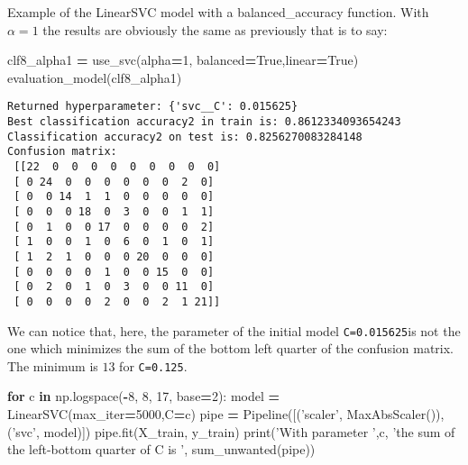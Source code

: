 \documentclass[10pt,a4paper]{article}
\newenvironment{Shaded}{\begin{snugshade}}{\end{snugshade}}
\newcommand{\BuiltInTok}[1]{#1}
\newcommand{\ControlFlowTok}[1]{\textcolor[rgb]{0.13,0.29,0.53}{\textbf{#1}}}
\newcommand{\DecValTok}[1]{\textcolor[rgb]{0.00,0.00,0.81}{#1}}
\newcommand{\KeywordTok}[1]{\textcolor[rgb]{0.13,0.29,0.53}{\textbf{#1}}}
\newcommand{\NormalTok}[1]{#1}
\newcommand{\OperatorTok}[1]{\textcolor[rgb]{0.81,0.36,0.00}{\textbf{#1}}}
\newcommand{\StringTok}[1]{\textcolor[rgb]{0.31,0.60,0.02}{#1}}
\newcommand{\VariableTok}[1]{\textcolor[rgb]{0.00,0.00,0.00}{#1}}
\theoremstyle{break}
\begin{document}
Example of the LinearSVC model with a balanced\_accuracy function. With \(\alpha = 1\) the results are obviously the same as previously that is to say:

\begin{Shaded}
\begin{Highlighting}[]
\NormalTok{clf8_alpha1 }\OperatorTok{=}\NormalTok{ use_svc(alpha}\OperatorTok{=}\DecValTok{1}\NormalTok{, balanced}\OperatorTok{=}\VariableTok{True}\NormalTok{,linear}\OperatorTok{=}\VariableTok{True}\NormalTok{)}
\NormalTok{evaluation_model(clf8_alpha1)}
\end{Highlighting}
\end{Shaded}

\begin{verbatim}
Returned hyperparameter: {'svc__C': 0.015625}
Best classification accuracy2 in train is: 0.8612334093654243
Classification accuracy2 on test is: 0.8256270083284148
Confusion matrix: 
 [[22  0  0  0  0  0  0  0  0  0]
 [ 0 24  0  0  0  0  0  0  2  0]
 [ 0  0 14  1  1  0  0  0  0  0]
 [ 0  0  0 18  0  3  0  0  1  1]
 [ 0  1  0  0 17  0  0  0  0  2]
 [ 1  0  0  1  0  6  0  1  0  1]
 [ 1  2  1  0  0  0 20  0  0  0]
 [ 0  0  0  0  1  0  0 15  0  0]
 [ 0  2  0  1  0  3  0  0 11  0]
 [ 0  0  0  0  2  0  0  2  1 21]]
\end{verbatim}

We can notice that, here, the parameter of the initial model \texttt{C=0.015625}is not the one which minimizes the sum of the bottom left quarter of the confusion matrix. The minimum is \(13\) for \texttt{C=0.125}.

\begin{Shaded}
\begin{Highlighting}[]
\ControlFlowTok{for}\NormalTok{ c }\KeywordTok{in}\NormalTok{ np.logspace(}\OperatorTok{-}\DecValTok{8}\NormalTok{, }\DecValTok{8}\NormalTok{, }\DecValTok{17}\NormalTok{, base}\OperatorTok{=}\DecValTok{2}\NormalTok{):}
\NormalTok{    model }\OperatorTok{=}\NormalTok{ LinearSVC(max_iter}\OperatorTok{=}\DecValTok{5000}\NormalTok{,C}\OperatorTok{=}\NormalTok{c)}
\NormalTok{    pipe }\OperatorTok{=}\NormalTok{ Pipeline([(}\StringTok{'scaler'}\NormalTok{, MaxAbsScaler()), (}\StringTok{'svc'}\NormalTok{, model)])}
\NormalTok{    pipe.fit(X_train, y_train)}
    \BuiltInTok{print}\NormalTok{(}\StringTok{'With parameter '}\NormalTok{,c, }\StringTok{'the sum of the left-bottom quarter of C is '}\NormalTok{, sum_unwanted(pipe))}
\end{Highlighting}
\end{Shaded}
\end{document}
